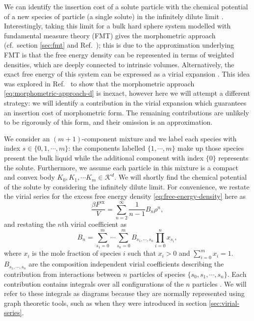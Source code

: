 \documentclass[11pt,twoside]{report}
\begin{document}
We can identify the insertion cost of a solute particle with the chemical potential of a new species of particle (a single solute) in the infinitely dilute limit \cite{ReissJCP1959,Hansen-GoosJPCM2006,Hansen-GoosJCP2014}.
Interestingly, taking this limit for a bulk hard sphere system modelled with fundamental measure theory (FMT) gives the morphometric approach (cf.\ section \ref{sec:fmt} and Ref.\ \cite{Hansen-GoosJPCM2006}); this is due to the approximation underlying FMT is that the free energy density can be represented in terms of weighted densities, which are deeply connected to intrinsic volumes.
Alternatively, the exact free energy of this system can be expressed as a virial expansion \cite{Hansen2013}.
This idea was explored in Ref.\ \cite{Hansen-GoosJPCM2006} to show that the morphometric approach \eqref{eq:morphometric-approach-d} is inexact, however here we will attempt a different strategy: we will identify a contribution in the virial expansion which guarantees an insertion cost of morphometric form.
The remaining contributions are unlikely to be rigorously of this form, and their omission is an approximation.

We consider an $(m+1)$-component mixture and we label each species with index $s \in \{0, 1, \cdots, m\}$: the components labelled $\{1, \cdots, m\}$ make up those species present the bulk liquid while the additional component with index $\{0\}$ represents the solute.
Furthermore, we assume each particle in this mixture is a compact and convex body $K_0, K_1, \cdots K_m \in \mathcal{K}^d$.
We will shortly find the chemical potential of the solute by considering the infinitely dilute limit.
For convenience, we restate the virial series for the excess free energy density \eqref{eq:free-energy-density} here as
\begin{equation}
  \frac{\beta F^\mathrm{ex}}{V}
  =
  \sum_{n=2}^\infty
  \frac{1}{n-1}
  B_n
  \rho^n,
\end{equation}
and restating the $n$th virial coefficient \label{eq:virial-coefficients-mixtures} as
\begin{equation}
  B_n
  =
  \sum_{s_1=0}^m \cdots \sum_{s_n=0}^m
  B_{s_1, \cdots, s_n} \prod_{i=0}^n x_{s_i},
\end{equation}
where $x_i$ is the mole fraction of species $i$ such that $x_i > 0$ and $\sum_{i=0}^m x_i = 1$.
$B_{s_1, \cdots, s_n}$ are the composition independent virial coefficients describing the contribution from interactions between $n$ particles of species $\{s_0, s_1, \cdots, s_n\}$.
Each contribution contains integrals over all configurations of the $n$ particles \cite{Hansen2013,Santos2016}.
We will refer to these integrals as diagrams because they are normally represented using graph theoretic tools, such as when they were introduced in section \ref{sec:virial-series}.
\end{document}
